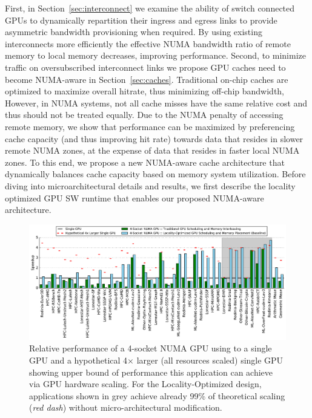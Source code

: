 First, in Section~\ref{sec:interconnect} we examine the 
ability of switch connected GPUs to dynamically repartition their ingress and 
egress links to provide asymmetric bandwidth provisioning when required.  By 
using existing interconnects more efficiently the effective NUMA bandwidth ratio 
of remote memory to local memory decreases, improving performance. Second, 
to minimize traffic on oversubscribed interconnect links we propose GPU caches need 
to become NUMA-aware in Section~\ref{sec:caches}. Traditional on-chip caches are 
optimized to maximize 
overall hitrate, thus minimizing off-chip bandwidth, However, in NUMA 
systems, not all cache misses have the same relative cost and thus should not 
be treated equally. Due to the NUMA penalty of accessing remote memory, we show 
that performance can be maximized by preferencing cache capacity (and thus 
improving hit rate) towards data that resides in slower remote NUMA zones, at the 
expense of data that resides in faster local NUMA zones. To this end, we propose 
a new NUMA-aware cache architecture that dynamically balances cache capacity based on 
memory system utilization. Before diving into microarchitectural details and results,
we first describe the locality optimized GPU SW runtime that enables our proposed
NUMA-aware architecture.

\begin{figure}[tp] 
    \centering
    \includegraphics[width=1.0\linewidth]{figures/plot_different_baselines.pdf}
    \caption{Relative performance of a 4-socket NUMA GPU using to a single GPU 
and a hypothetical 4$\times$ larger (all resources scaled) single GPU showing 
upper bound of performance this application can achieve via GPU hardware 
scaling. For the Locality-Optimized design, applications shown in grey 
achieve already 99\% of theoretical scaling (\emph{red dash}) without 
micro-architectural modification.}
    \label{fig:motivation}
    \vspace{-.2in}
\end{figure}
